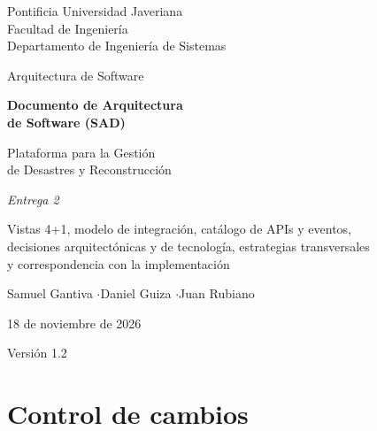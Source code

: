 \documentclass[11pt,letterpaper]{article}
\begin{document}
\begin{titlepage}
\centering
\vspace*{2.2cm}
{\large Pontificia Universidad Javeriana\\ Facultad de Ingeniería\\ Departamento de Ingeniería de Sistemas\par}
\vspace{0.4cm}
{\large Arquitectura de Software\par}
\vspace{2.2cm}
{\Huge\bfseries Documento de Arquitectura\\[3mm] de Software (SAD)\par}
\vspace{1.0cm}
{\LARGE Plataforma para la Gestión\\[2mm] de Desastres y Reconstrucción\par}
\vspace{1.6cm}
{\large\itshape Entrega 2\par}
{\large Vistas 4+1, modelo de integración, catálogo de APIs y eventos,\\ decisiones arquitectónicas y de tecnología, estrategias transversales\\ y correspondencia con la implementación\par}
\vspace{2.2cm}
{\large Samuel Gantiva \quad$\cdot$\quad Daniel Guiza \quad$\cdot$\quad Juan Rubiano\par}
\vspace{1.2cm}
{\large 18 de noviembre de 2026\par}
\vfill
{\small Versión 1.2\par}
\end{titlepage}

\section*{Control de cambios}
\end{document}
